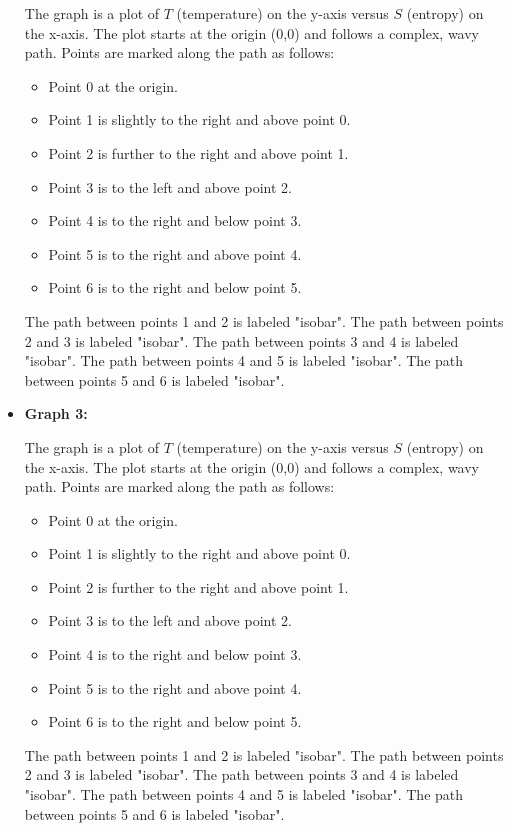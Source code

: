 \begin{itemize}
    The graph is a plot of \( T \) (temperature) on the y-axis versus \( S \) (entropy) on the x-axis. The plot starts at the origin (0,0) and follows a complex, wavy path. Points are marked along the path as follows:
    \begin{itemize}
        \item Point 0 at the origin.
        \item Point 1 is slightly to the right and above point 0.
        \item Point 2 is further to the right and above point 1.
        \item Point 3 is to the left and above point 2.
        \item Point 4 is to the right and below point 3.
        \item Point 5 is to the right and above point 4.
        \item Point 6 is to the right and below point 5.
    \end{itemize}
    The path between points 1 and 2 is labeled "isobar". The path between points 2 and 3 is labeled "isobar". The path between points 3 and 4 is labeled "isobar". The path between points 4 and 5 is labeled "isobar". The path between points 5 and 6 is labeled "isobar".
    
    \item \textbf{Graph 3:}
    
    The graph is a plot of \( T \) (temperature) on the y-axis versus \( S \) (entropy) on the x-axis. The plot starts at the origin (0,0) and follows a complex, wavy path. Points are marked along the path as follows:
    \begin{itemize}
        \item Point 0 at the origin.
        \item Point 1 is slightly to the right and above point 0.
        \item Point 2 is further to the right and above point 1.
        \item Point 3 is to the left and above point 2.
        \item Point 4 is to the right and below point 3.
        \item Point 5 is to the right and above point 4.
        \item Point 6 is to the right and below point 5.
    \end{itemize}
    The path between points 1 and 2 is labeled "isobar". The path between points 2 and 3 is labeled "isobar". The path between points 3 and 4 is labeled "isobar". The path between points 4 and 5 is labeled "isobar". The path between points 5 and 6 is labeled "isobar".
\end{itemize}

